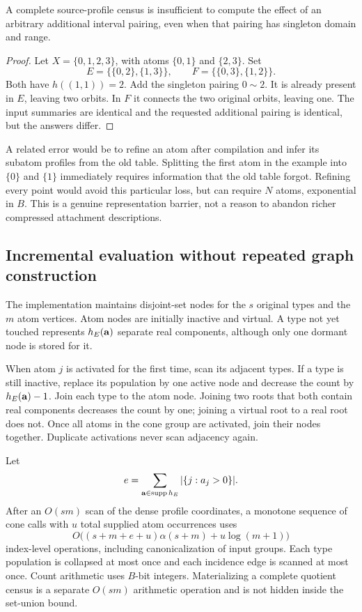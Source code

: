 \begin{proposition}
\label{prop:barrier}
A complete source-profile census is insufficient to compute the effect of
an arbitrary additional interval pairing, even when that pairing has
singleton domain and range.
\end{proposition}

\begin{proof}
Let $X=\{0,1,2,3\}$, with atoms $\{0,1\}$ and $\{2,3\}$. Set
\[
 E=\{\{0,2\},\{1,3\}\},\qquad
 F=\{\{0,3\},\{1,2\}\}.
\]
Both have $h((1,1))=2$. Add the singleton pairing $0\sim2$. It is already
present in $E$, leaving two orbits. In $F$ it connects the two original
orbits, leaving one. The input summaries are identical and the requested
additional pairing is identical, but the answers differ.
\end{proof}

A related error would be to refine an atom after compilation and infer its
subatom profiles from the old table. Splitting the first atom in the example
into $\{0\}$ and $\{1\}$ immediately requires information that the old table
forgot. Refining every point would avoid this particular loss, but can
require $N$ atoms, exponential in $B$. This is a genuine representation
barrier, not a reason to abandon richer compressed attachment descriptions.

\subsection{Incremental evaluation without repeated graph construction}

The implementation maintains disjoint-set nodes for the $s$ original types
and the $m$ atom vertices. Atom nodes are initially inactive and virtual.
A type not yet touched represents $h_E(\mathbf a)$ separate real components,
although only one dormant node is stored for it.

When atom $j$ is activated for the first time, scan its adjacent types. If a
type is still inactive, replace its population by one active node and decrease
the count by $h_E(\mathbf a)-1$. Join each type to the atom node. Joining two
roots that both contain real components decreases the count by one; joining
a virtual root to a real root does not. Once all atoms in the cone group
are activated, join their nodes together. Duplicate activations never scan
adjacency again.

\begin{theorem}
\label{thm:online}
Let
\[
 e=\sum_{\mathbf a\in\operatorname{supp} h_E}|\{j:a_j>0\}|.
\]
After an $O(sm)$ scan of the dense profile coordinates, a monotone sequence
of cone calls with $u$ total supplied atom occurrences uses
\[
 O\bigl((s+m+e+u)\alpha(s+m)+u\log(m+1)\bigr)
\]
index-level operations, including canonicalization of input groups. Each
type population is collapsed at most once and each incidence edge is
scanned at most once. Count arithmetic uses $B$-bit integers. Materializing
a complete quotient census is a separate $O(sm)$ arithmetic operation and
is not hidden inside the set-union bound.
\end{theorem}

